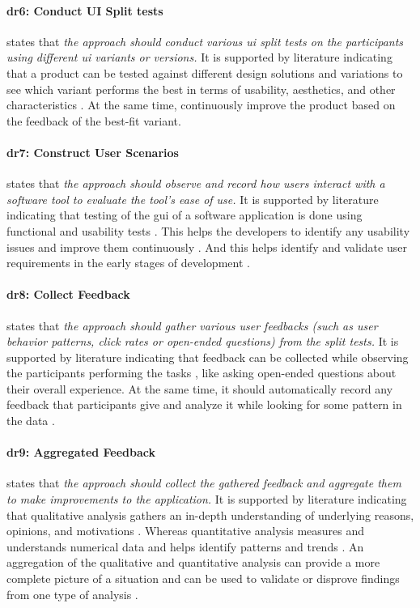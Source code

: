 \paragraph{\ac{dr}6: Conduct UI Split tests} states that \textit{the approach should conduct various \ac{ui} split tests on the participants using different \ac{ui} variants or versions.}
It is supported by literature indicating that a product can be tested against different design solutions and variations \cite{article:CE:fitzgerald} to see which variant performs the best in terms of usability, aesthetics, and other characteristics \cite{article:controlled:experiements}. 
At the same time, continuously improve \cite{article:CE:ros} the product based on the feedback of the best-fit variant.

\paragraph{\ac{dr}7: Construct User Scenarios} states that \textit{the approach should observe and record how users interact with a software tool to evaluate the tool's ease of use.} 
It is supported by literature indicating that testing of the \ac{gui} of a software application is done using functional and usability tests \cite{misc:usability:tasks}. 
This helps the developers to identify any usability issues \cite{article:tbup:kari} and improve them continuously \cite{article:prototyping:gould}.
And this helps identify and validate user requirements in the early stages of development \cite{article:prototyping:weichbroth}. 


\paragraph{\ac{dr}8: Collect Feedback} states that \textit{the approach should gather various user feedbacks (such as user behavior patterns, click rates or open-ended questions) from the split tests.}
It is supported by literature indicating that feedback can be collected while observing the participants performing the tasks \cite{misc:qualitative:qualitative}, like asking open-ended questions about their overall experience.
At the same time, it should automatically record any feedback that participants give and analyze it while looking for some pattern in the data \cite{article:qqa:young}.

\paragraph{\ac{dr}9: Aggregated Feedback} states that \textit{the approach should collect the gathered feedback and aggregate them to make improvements to the application.} 
It is supported by literature indicating that qualitative analysis gathers an in-depth understanding of underlying reasons, opinions, and motivations \cite{misc:dsr:mayring}.
Whereas quantitative analysis measures and understands numerical data and helps identify patterns and trends \cite{article:qqa:young}.
An aggregation of the qualitative and quantitative analysis can provide a more complete picture of a situation and can be used to validate or disprove findings from one type of analysis \cite{article:qq:helena}.


